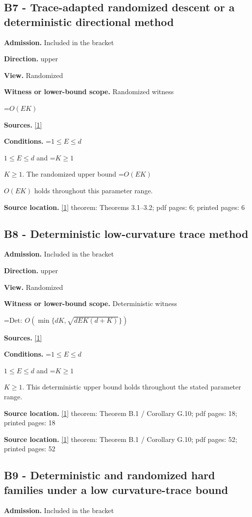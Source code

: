 \documentclass[10pt,a4paper]{article}
\newcommand{\AtlasMath}[1]{\par\begingroup\centering\setbox0=\hbox{$\displaystyle #1$}\ifdim\wd0>1.4\linewidth\typeout{ATLAS WIDE FORMULA: \the\wd0}\fi\ifdim\wd0>\linewidth\resizebox{\linewidth}{!}{\box0}\else\box0\fi\par\endgroup}
\newcommand{\AtlasInlineMath}[1]{\begingroup\setbox0=\hbox{$#1$}\ifdim\wd0>.4\linewidth\endgroup\AtlasMath{#1}\else\endgroup$#1$\fi}
\begin{document}
\subsection{B7 - Trace-adapted randomized descent or a deterministic directional method}
\textbf{Admission.} Included in the bracket

\textbf{Direction.} upper

\textbf{View.} Randomized

\textbf{Witness or lower-bound scope.} Randomized witness

\AtlasMath{O(EK)}
\textbf{Sources.} \href{https://arxiv.org/pdf/2610.27550v2}{[1]}

\textbf{Conditions.} \AtlasInlineMath{1\le E\le d} and \AtlasInlineMath{K\ge1}. The randomized upper bound \AtlasInlineMath{O(EK)} holds throughout this parameter range.

\textbf{Source location.} \href{https://arxiv.org/pdf/2610.27550v2}{[1]} theorem: Theorems 3.1--3.2; pdf pages: 6; printed pages: 6

\subsection{B8 - Deterministic low-curvature trace method}
\textbf{Admission.} Included in the bracket

\textbf{Direction.} upper

\textbf{View.} Randomized

\textbf{Witness or lower-bound scope.} Deterministic witness

\AtlasMath{\mathrm{Det}:\ O(\min\{dK,\sqrt{dEK(d+K)}\})}
\textbf{Sources.} \href{https://arxiv.org/pdf/2610.27550v2}{[1]}

\textbf{Conditions.} \AtlasInlineMath{1\le E\le d} and \AtlasInlineMath{K\ge1}. This deterministic upper bound holds throughout the stated parameter range.

\textbf{Source location.} \href{https://arxiv.org/pdf/2610.27550v2}{[1]} theorem: Theorem B.1 / Corollary G.10; pdf pages: 18; printed pages: 18

\textbf{Source location.} \href{https://arxiv.org/pdf/2610.27550v2}{[1]} theorem: Theorem B.1 / Corollary G.10; pdf pages: 52; printed pages: 52

\subsection{B9 - Deterministic and randomized hard families under a low curvature-trace bound}
\textbf{Admission.} Included in the bracket
\end{document}
